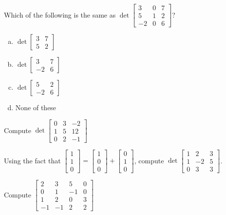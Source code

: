 \begin{applicationActivities}{2}{26}
\begin{activity}{0}
  Which of the following is the same as $\det \begin{bmatrix} 3 & 0 & 7 \\  5 & 1 & 2 \\  -2 & 0 & 6 \end{bmatrix}$?
\begin{enumerate}[(a)]
\item $\det \begin{bmatrix} 3 & 7 \\ 5 & 2 \end{bmatrix}$
\item $\det \begin{bmatrix} 3 & 7 \\ -2 & 6 \end{bmatrix}$
\item $\det \begin{bmatrix} 5 & 2 \\ -2 & 6 \end{bmatrix}$
\item None of these
\end{enumerate}
\end{activity}

\begin{activity}{0}
  Compute $\det \begin{bmatrix} 0 & 3 & -2 \\ 1 & 5 & 12 \\ 0 & 2 & -1 \end{bmatrix}$
\end{activity}

\begin{activity}{0}
   Using the fact that $\begin{bmatrix} 1 \\ 1 \\ 0 \end{bmatrix} = \begin{bmatrix} 1 \\ 0 \\ 0 \end{bmatrix} + \begin{bmatrix} 0 \\ 1 \\ 0 \end{bmatrix}$, compute $\det \begin{bmatrix} 1 & 2 & 3 \\ 1 & -2 & 5 \\ 0 & 3 & 3 \end{bmatrix}$.
\end{activity}

\begin{activity}{0}
   Compute $\begin{bmatrix} 2 & 3 & 5 & 0 \\ 0 & 1 & -1 & 0 \\ 1 & 2 & 0 & 3 \\ -1 & -1 & 2 & 2 \end{bmatrix}$
\end{activity}

\end{applicationActivities}
